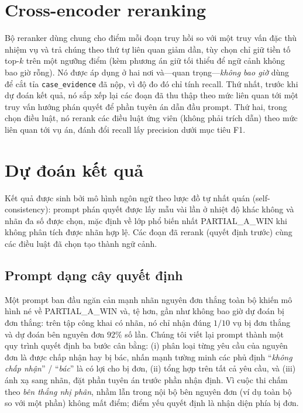 \documentclass[conference]{IEEEtran}
\begin{document}
\section{Cross-encoder reranking}
Bộ reranker dùng chung cho điểm mỗi đoạn truy hồi so với một truy vấn đặc thù nhiệm vụ và trả chúng theo thứ tự liên quan giảm dần, tùy chọn chỉ giữ tiền tố top-$k$ trên một ngưỡng điểm (kèm phương án giữ tối thiểu để ngữ cảnh không bao giờ rỗng). Nó được áp dụng ở hai nơi và---quan trọng---\emph{không bao giờ} dùng để cắt tỉa \texttt{case\_evidence} đã nộp, vì độ đo đó chỉ tính recall. Thứ nhất, trước khi dự đoán kết quả, nó sắp xếp lại các đoạn đã thu thập theo mức liên quan tới một truy vấn hướng phán quyết để phần tuyên án dẫn đầu prompt. Thứ hai, trong chọn điều luật, nó rerank các điều luật ứng viên (không phải trích dẫn) theo mức liên quan tới vụ án, đánh đổi recall lấy precision dưới mục tiêu F1.

\section{Dự đoán kết quả}
Kết quả được sinh bởi mô hình ngôn ngữ theo lược đồ tự nhất quán (self-consistency): prompt phán quyết được lấy mẫu vài lần ở nhiệt độ khác không và nhãn đa số được chọn, mặc định về lớp phổ biến nhất \textsf{PARTIAL\_A\_WIN} khi không phân tích được nhãn hợp lệ. Các đoạn đã rerank (quyết định trước) cùng các điều luật đã chọn tạo thành ngữ cảnh.

\subsection{Prompt dạng cây quyết định}
Một prompt ban đầu ngăn cản mạnh nhãn nguyên đơn thắng toàn bộ khiến mô hình né về \textsf{PARTIAL\_A\_WIN} và, tệ hơn, gần như không bao giờ dự đoán bị đơn thắng: trên tập công khai có nhãn, nó chỉ nhận đúng $1/10$ vụ bị đơn thắng và dự đoán bên nguyên đơn $92\%$ số lần. Chúng tôi viết lại prompt thành một quy trình quyết định ba bước cân bằng: (i) phân loại từng yêu cầu của nguyên đơn là được chấp nhận hay bị bác, nhấn mạnh tường minh các phủ định ``\textit{không chấp nhận}'' / ``\textit{bác}'' là có lợi cho bị đơn, (ii) tổng hợp trên tất cả yêu cầu, và (iii) ánh xạ sang nhãn, đặt phần tuyên án trước phần nhận định. Vì cuộc thi chấm theo \emph{bên thắng nhị phân}, nhầm lẫn trong nội bộ bên nguyên đơn (ví dụ toàn bộ so với một phần) không mất điểm; điểm yếu quyết định là nhận diện phía bị đơn.
\end{document}
